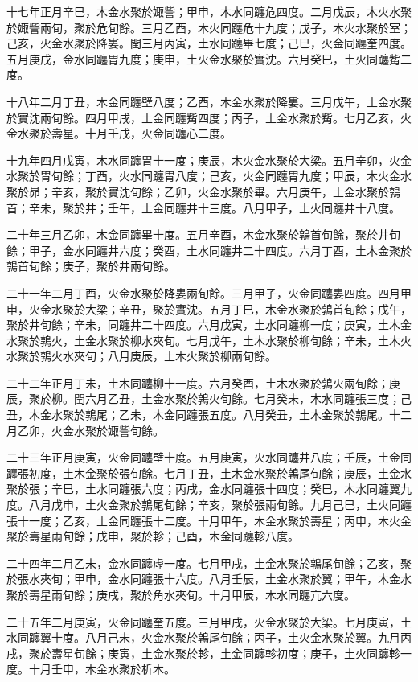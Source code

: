 \begin{pinyinscope}
十七年正月辛巳，木金水聚於娵訾；甲申，木水同躔危四度。二月戊辰，木火水聚於娵訾兩旬，聚於危旬餘。三月乙酉，木火同躔危十九度；戊子，木火水聚於室；己亥，火金水聚於降婁。閏三月丙寅，土水同躔畢七度；己巳，火金同躔奎四度。五月庚戌，金水同躔胃九度；庚申，土火金水聚於實沈。六月癸巳，土火同躔觜二度。

十八年二月丁丑，木金同躔壁八度；乙酉，木金水聚於降婁。三月戊午，土金水聚於實沈兩旬餘。四月甲戌，土金同躔觜四度；丙子，土金水聚於觜。七月乙亥，火金水聚於壽星。十月壬戌，火金同躔心二度。

十九年四月戊寅，木水同躔胃十一度；庚辰，木火金水聚於大梁。五月辛卯，火金水聚於胃旬餘；丁酉，火水同躔胃八度；己亥，火金同躔胃九度；甲辰，木火金水聚於昴；辛亥，聚於實沈旬餘；乙卯，火金水聚於畢。六月庚午，土金水聚於鶉首；辛未，聚於井；壬午，土金同躔井十三度。八月甲子，土火同躔井十八度。

二十年三月乙卯，木金同躔畢十度。五月辛酉，木金水聚於鶉首旬餘，聚於井旬餘；甲子，金水同躔井六度；癸酉，土水同躔井二十四度。六月丁酉，土木金聚於鶉首旬餘；庚子，聚於井兩旬餘。

二十一年二月丁酉，火金水聚於降婁兩旬餘。三月甲子，火金同躔婁四度。四月甲申，火金水聚於大梁；辛丑，聚於實沈。五月丁巳，木金水聚於鶉首旬餘；戊午，聚於井旬餘；辛未，同躔井二十四度。六月戊寅，土水同躔柳一度；庚寅，土木金水聚於鶉火，土金水聚於柳水夾旬。七月戊午，土木水聚於柳旬餘；辛未，土木火水聚於鶉火水夾旬；八月庚辰，土木火聚於柳兩旬餘。

二十二年正月丁未，土木同躔柳十一度。六月癸酉，土木水聚於鶉火兩旬餘；庚辰，聚於柳。閏六月乙丑，土金水聚於鶉火旬餘。七月癸未，木水同躔張三度；己丑，木金水聚於鶉尾；乙未，木金同躔張五度。八月癸丑，土木金聚於鶉尾。十二月乙卯，火金水聚於娵訾旬餘。

二十三年正月庚寅，火金同躔壁十度。五月庚寅，火水同躔井八度；壬辰，土金同躔張初度，土木金聚於張旬餘。七月丁丑，土木金水聚於鶉尾旬餘；庚辰，土金水聚於張；辛巳，土水同躔張六度；丙戌，金水同躔張十四度；癸巳，木水同躔翼九度。八月戊申，土火金聚於鶉尾旬餘；辛亥，聚於張兩旬餘。九月己巳，土火同躔張十一度；乙亥，土金同躔張十二度。十月甲午，木金水聚於壽星；丙申，木火金聚於壽星兩旬餘；戊申，聚於軫；己酉，木金同躔軫八度。

二十四年二月乙未，金水同躔虛一度。七月甲戌，土金水聚於鶉尾旬餘；乙亥，聚於張水夾旬；甲申，金水同躔張十六度。八月壬辰，土金水聚於翼；甲午，木金水聚於壽星兩旬餘；庚戌，聚於角水夾旬。十月甲辰，木水同躔亢六度。

二十五年二月庚寅，火金同躔奎五度。三月甲戌，火金水聚於大梁。七月庚寅，土水同躔翼十度。八月己未，火金水聚於鶉尾旬餘；丙子，土火金水聚於翼。九月丙戌，聚於壽星旬餘；庚寅，土金水聚於軫，土金同躔軫初度；庚子，土火同躔軫一度。十月壬申，木金水聚於析木。


\end{pinyinscope}
